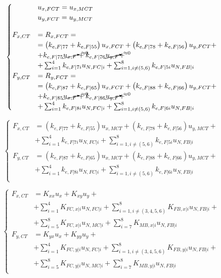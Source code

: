 \documentclass[a4paper]{jpconf}
\begin{document}
\begin{equation}
\begin{cases}
&u_{x,FCT}=u_{x,MCT}\\
&u_{y,FCT}=u_{y,MCT}\\[10pt]
F_{x,CT}&=R_{x,FCT}=\\&=\left(k_{e,F|77}+k_{e,F|55}\right)u_{x,FCT}+\left(k_{e,F|78}+k_{e,F|56}\right)u_{y,FCT}+\\
&+k_{e,F|75}\cancelto{\approx 0}{u_{x,F}}+k_{e,F|76}\cancelto{\approx 0}{u_{y,F}}+\\
&+\sum_{i=1}^{4}k_{e,F|7i}u_{N,FC|i}+\sum_{i=1,i\neq\left(5,6\right)}^{8}k_{e,F|5i}u_{N,FB|i}\\
F_{y,CT}&=R_{y,FCT}=\\&=\left(k_{e,F|87}+k_{e,F|65}\right)u_{x,FCT}+\left(k_{e,F|88}+k_{e,F|66}\right)u_{y,FCT}+\\
&+k_{e,F|85}\cancelto{\approx 0}{u_{x,F}}+k_{e,F|86}\cancelto{\approx 0}{u_{y,F}}+\\
&+\sum_{i=1}^{4}k_{e,F|8i}u_{N,FC|i}+\sum_{i=1,i\neq\left(5,6\right)}^{8}k_{e,F|6i}u_{N,FB|i}\\
\end{cases}
\end{equation}

\begin{equation}
\begin{cases}
F_{x,CT}&=\left(k_{e,F|77}+k_{e,F|55}\right)u_{x,MCT}+\left(k_{e,F|78}+k_{e,F|56}\right)u_{y,MCT}+\\
&+\sum_{i=1}^{4}k_{e,F|7i}u_{N,FC|i}+\sum_{i=1,i\neq\left(5,6\right)}^{8}k_{e,F|5i}u_{N,FB|i}\\
F_{y,CT}&=\left(k_{e,F|87}+k_{e,F|65}\right)u_{x,MCT}+\left(k_{e,F|88}+k_{e,F|66}\right)u_{y,MCT}+\\
&+\sum_{i=1}^{4}k_{e,F|8i}u_{N,FC|i}+\sum_{i=1,i\neq\left(5,6\right)}^{8}k_{e,F|6i}u_{N,FB|i}\\
\end{cases}
\end{equation}

\begin{equation}
\begin{cases}
F_{x,CT}&= K_{xx}u_{x}+K_{xy}u_{y}+\\
&+\sum_{i=1}^{4}K_{FC,x|i}u_{N,FC|i}+\sum_{i=1,i\neq\left(3,4,5,6\right)}^{8}K_{FB,x|i}u_{N,FB|i}+\\
&+\sum_{i=5}^{8}K_{FC,x|i}u_{N,MC|i}+\sum_{i=7}^{8}K_{MB,x|i}u_{N,FB|i}\\
F_{y,CT}&= K_{yx}u_{x}+K_{yy}u_{y}+\\
&+\sum_{i=1}^{4}K_{FC,y|i}u_{N,FC|i}+\sum_{i=1,i\neq\left(3,4,5,6\right)}^{8}K_{FB,y|i}u_{N,FB|i}+\\
&+\sum_{i=5}^{8}K_{FC,y|i}u_{N,MC|i}+\sum_{i=7}^{8}K_{MB,y|i}u_{N,FB|i}\\
\end{cases}
\end{equation}
\end{document}
